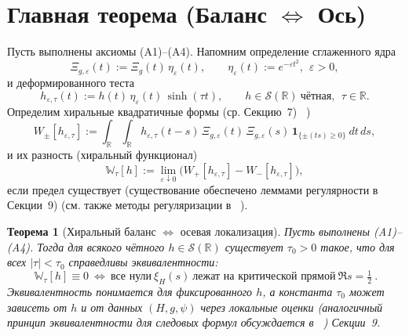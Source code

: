 \documentclass{article}
\numberwithin{equation}{section}
\theoremstyle{plain}
\newtheorem{theorem}{Теорема}
\theoremstyle{definition}
\theoremstyle{remark}
\def\eta{η}\def\mu{μ}\def\nu{ν}\def\lambda{λ}\def\Lambda{Λ}%
\begin{document}
\clearpage

\section{\texorpdfstring{Главная теорема (Баланс $\Longleftrightarrow$ Ось)}{Главная теорема (Баланс ↔ Ось)}}

\noindent
Пусть выполнены аксиомы (A1)–(A4). Напомним определение сглаженного ядра
\begin{equation}
\label{eq:Xieps}
\Xi_{g,\varepsilon}(t):=\Xi_g(t)\,\eta_\varepsilon(t),\qquad 
\eta_\varepsilon(t):=e^{-\varepsilon t^2},\ \ \varepsilon>0,
\end{equation}
и деформированного теста
\begin{equation}
\label{eq:heps-tau}
h_{\varepsilon,\tau}(t):=h(t)\,\eta_\varepsilon(t)\,\sinh(\tau t),
\qquad h\in\mathcal S(\mathbb R)\ \text{чётная},\ \ \tau\in\mathbb R.
\end{equation}
Определим хиральные квадратичные формы (ср. Секцию~7) ~\cite{Jaffe2007})
\begin{equation}
\label{eq:Wpm}
W_\pm[h_{\varepsilon,\tau}]
:=\int_{\mathbb R}\!\int_{\mathbb R} 
h_{\varepsilon,\tau}(t-s)\,\Xi_{g,\varepsilon}(t)\,\Xi_{g,\varepsilon}(s)\,
\mathbf 1_{\{\pm(ts)\ge 0\}}\ dt\,ds,
\end{equation}
и их разность (хиральный функционал)
\begin{equation}
\label{eq:Wtau}
\mathbb W_\tau[h]
:=\lim_{\varepsilon\downarrow 0}\Big(
W_+[h_{\varepsilon,\tau}]-W_-[h_{\varepsilon,\tau}]
\Big),
\end{equation}
если предел существует (существование обеспечено леммами регулярности в Секции~9) (см. также методы регуляризации в ~\cite{GelfandShilov1968}).

\begin{theorem}[Хиральный баланс $\Longleftrightarrow$ осевая локализация]
\label{thm:balance-axis}
Пусть выполнены (A1)–(A4). Тогда для всякого чётного $h\in\mathcal S(\mathbb R)$ существует $\tau_0>0$ такое, что для всех $|\tau|<\tau_0$ справедливы эквивалентности:
\begin{equation}
\label{eq:balance-axis}
\boxed{\ \mathbb W_\tau[h]\equiv 0\ 
\Longleftrightarrow\ 
\text{все нули}\ \xi_H(s)\ \text{лежат на критической прямой}\ \Re s=\tfrac12\ . }
\end{equation}
Эквивалентность понимается для фиксированного $h$, а константа $\tau_0$ может зависеть от $h$ и от данных $(H,g,\psi)$ через локальные оценки 
(аналогичный принцип эквивалентности для следовых формул обсуждается в ~\cite{Connes1999}) Секции~9.
\end{theorem}
\end{document}
